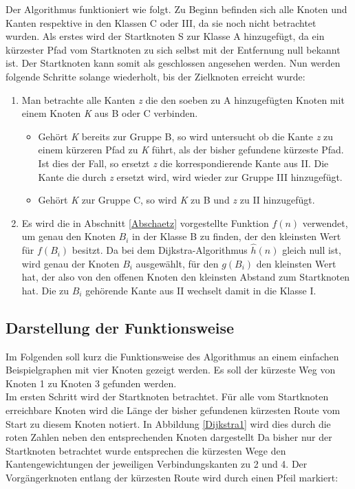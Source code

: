 		Der Algorithmus funktioniert wie folgt. Zu Beginn befinden sich alle Knoten und Kanten respektive in den Klassen C oder III, da sie noch nicht betrachtet wurden. Als erstes wird der Startknoten S zur Klasse A hinzugefügt, da ein kürzester Pfad vom Startknoten zu sich selbst mit der Entfernung null bekannt ist. Der Startknoten kann somit als geschlossen angesehen werden. Nun werden folgende Schritte solange wiederholt, bis der Zielknoten erreicht wurde:
		\begin{center}
			\begin{minipage}{0.8\linewidth}

				\begin{enumerate}
					\item Man betrachte alle Kanten \textit{z} die den soeben zu A hinzugefügten Knoten mit einem Knoten \textit{K} aus B oder C verbinden. 
					\begin{itemize}
						\item Gehört \textit{K} bereits zur Gruppe B, so wird untersucht ob die Kante \textit{z} zu einem kürzeren Pfad zu \textit{K} führt, als der bisher gefundene kürzeste Pfad. Ist dies der Fall, so ersetzt \textit{z} die korrespondierende Kante aus II. Die Kante die durch \textit{z} ersetzt wird, wird wieder zur Gruppe III hinzugefügt.
						\item Gehört \textit{K} zur Gruppe  C, so wird \textit{K} zu B und \textit{z} zu II hinzugefügt.
					\end{itemize}
					\item Es wird die in Abschnitt \ref{Abschaetz} vorgestellte Funktion $f(n)$ verwendet, um genau den Knoten $B_i$ in der Klasse B zu finden, der den kleinsten Wert für $f(B_i)$ besitzt. Da bei dem Dijkstra-Algorithmus $\hat{h}(n)$ gleich null ist, wird genau der Knoten  $B_i$ ausgewählt, für den $g(B_i)$ den kleinsten Wert hat, der also von den offenen Knoten den kleinsten Abstand zum Startknoten hat. Die zu $B_i$ gehörende Kante aus II wechselt damit in die Klasse I.
				\end{enumerate}
				
			\end{minipage}
		\end{center}
	\subsection{Darstellung der Funktionsweise}
		Im Folgenden soll kurz die Funktionsweise des Algorithmus an einem einfachen Beispielgraphen mit vier Knoten gezeigt werden. Es soll der kürzeste Weg von Knoten 1 zu Knoten 3 gefunden werden.\\[4pt]
		Im ersten Schritt wird der Startknoten betrachtet. Für alle vom Startknoten erreichbare Knoten wird die Länge der bisher gefundenen kürzesten Route vom Start zu diesem Knoten notiert. In Abbildung \ref{Dijkstra1} wird dies durch die roten Zahlen neben den entsprechenden Knoten dargestellt Da bisher nur der Startknoten betrachtet wurde entsprechen die kürzesten Wege den Kantengewichtungen der jeweiligen Verbindungskanten zu 2 und 4. Der Vorgängerknoten entlang der kürzesten Route wird durch einen Pfeil markiert:
		
